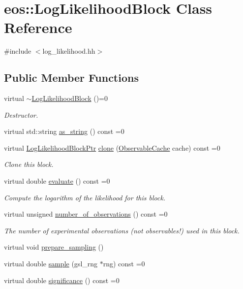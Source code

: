 \hypertarget{classeos_1_1LogLikelihoodBlock}{
\section{eos::LogLikelihoodBlock Class Reference}
\label{classeos_1_1LogLikelihoodBlock}
}


{\ttfamily \#include $<$log\_\-likelihood.hh$>$}\subsection*{Public Member Functions}
\begin{DoxyCompactItemize}
\item 
virtual \hyperlink{classeos_1_1LogLikelihoodBlock_a0217895e8d4cf8b69c3086b28ae152a1}{$\sim$LogLikelihoodBlock} ()=0
\begin{DoxyCompactList}\small\item\em Destructor. \item\end{DoxyCompactList}\item 
virtual std::string \hyperlink{classeos_1_1LogLikelihoodBlock_ad99b9336fdbb4c28eedc50b18d3c60c3}{as\_\-string} () const =0
\item 
virtual \hyperlink{namespaceeos_ab823a6782e060c440e05a614158ad1bf}{LogLikelihoodBlockPtr} \hyperlink{classeos_1_1LogLikelihoodBlock_a950a255f78736f75b2458e48c30e119f}{clone} (\hyperlink{classeos_1_1ObservableCache}{ObservableCache} cache) const =0
\begin{DoxyCompactList}\small\item\em Clone this block. \item\end{DoxyCompactList}\item 
virtual double \hyperlink{classeos_1_1LogLikelihoodBlock_a85ba7e331d03681a5f356bb2df7d1ac7}{evaluate} () const =0
\begin{DoxyCompactList}\small\item\em Compute the logarithm of the likelihood for this block. \item\end{DoxyCompactList}\item 
virtual unsigned \hyperlink{classeos_1_1LogLikelihoodBlock_a48f03be5dc8284368cae6a9830627f2e}{number\_\-of\_\-observations} () const =0
\begin{DoxyCompactList}\small\item\em The number of experimental observations (not observables!) used in this block. \item\end{DoxyCompactList}\item 
virtual void \hyperlink{classeos_1_1LogLikelihoodBlock_abb412e8a3fde0945f940ddcd6f79e68c}{prepare\_\-sampling} ()
\item 
virtual double \hyperlink{classeos_1_1LogLikelihoodBlock_ad0669d109d0d004cc5674c739fb41d7a}{sample} (gsl\_\-rng $\ast$rng) const =0
\item 
virtual double \hyperlink{classeos_1_1LogLikelihoodBlock_a52c12058a07b20a5b910dea8972f5282}{significance} () const =0
\end{DoxyCompactItemize}
